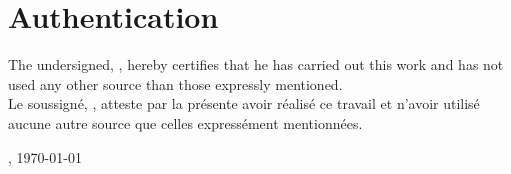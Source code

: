 \hspace{0pt}
\vfill
\section{Authentication}
The undersigned, \TBauthor, hereby certifies that he has carried out this work and has not used any other source than those expressly mentioned.
\\

Le soussigné, \TBauthor, atteste par la présente avoir réalisé  ce travail et n’avoir utilisé aucune autre source que celles expressément mentionnées.

\vspace{2cm}

, \today

\vspace{3cm}

\begin{flushright}
  \begin{minipage}{7cm}
    {\TBauthor}
  \end{minipage}\hfill
\end{flushright}
\vfill
\hspace{0pt}
